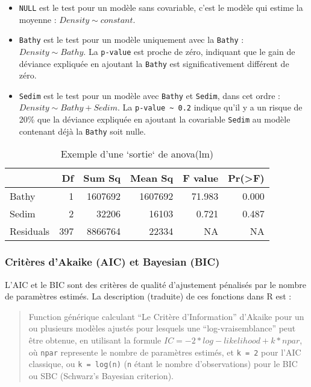 \documentclass[french,a4paper]{article}
\providecommand{\tightlist}{%
  \setlength{\itemsep}{0pt}\setlength{\parskip}{0pt}}
\begin{document}
\begin{itemize}
\tightlist
\item
  \texttt{NULL} est le test pour un modèle sans covariable, c'est le
  modèle qui estime la moyenne : \(Density \sim constant\).
\item
  \texttt{Bathy} est le test pour un modèle uniquement avec la
  \texttt{Bathy} : \(Density \sim Bathy\). La \texttt{p-value} est
  proche de zéro, indiquant que le gain de déviance expliquée en
  ajoutant la \texttt{Bathy} est significativement différent de zéro.
\item
  \texttt{Sedim} est le test pour un modèle avec \texttt{Bathy} et
  \texttt{Sedim}, dans cet ordre : \(Density \sim Bathy + Sedim\). La
  \texttt{p-value\ \textasciitilde{}\ 0.2} indique qu'il y a un risque
  de 20\% que la déviance expliquée en ajoutant la covariable
  \texttt{Sedim} au modèle contenant déjà la \texttt{Bathy} soit nulle.
\end{itemize}

\begin{table}

\caption{\label{tab:RTableAnova}Exemple d'une `sortie` de anova(lm)}
\centering
\begin{tabular}[t]{l|r|r|r|r|r}
\hline
  & Df & Sum Sq & Mean Sq & F value & Pr(>F)\\
\hline
Bathy & 1 & 1607692 & 1607692 & 71.983 & 0.000\\
\hline
Sedim & 2 & 32206 & 16103 & 0.721 & 0.487\\
\hline
Residuals & 397 & 8866764 & 22334 & NA & NA\\
\hline
\end{tabular}
\end{table}

\hypertarget{criteres-dakaike-aic-et-bayesian-bic}{%
\subsubsection{Critères d'Akaike (AIC) et Bayesian
(BIC)}\label{criteres-dakaike-aic-et-bayesian-bic}}

L'AIC et le BIC sont des critères de qualité d'ajustement pénalisés par
le nombre de paramètres estimés. La description (traduite) de ces
fonctions dans R est :

\begin{quote}
Function générique calculant ``Le Critère d'Information'' d'Akaike pour
un ou plusieurs modèles ajustés pour lesquels une ``log-vraisemblance''
peut être obtenue, en utilisant la formule
\(IC = -2*log-likelihood + k*npar\), où \texttt{npar} represente le
nombre de paramètres estimés, et \texttt{k\ =\ 2} pour l'AIC classique,
ou \texttt{k\ =\ log(n)} (\texttt{n} étant le nombre d'observations)
pour le BIC ou SBC (Schwarz's Bayesian criterion).
\end{quote}
\end{document}

